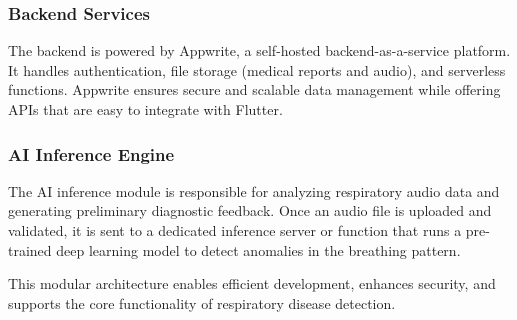 \subsubsection*{Backend Services}

The backend is powered by Appwrite, a self-hosted backend-as-a-service platform. It handles authentication, file storage (medical reports and audio), and serverless functions. Appwrite ensures secure and scalable data management while offering APIs that are easy to integrate with Flutter.

\subsubsection*{AI Inference Engine}

The AI inference module is responsible for analyzing respiratory audio data and generating preliminary diagnostic feedback. Once an audio file is uploaded and validated, it is sent to a dedicated inference server or function that runs a pre-trained deep learning model to detect anomalies in the breathing pattern.

\vspace{1em}

This modular architecture enables efficient development, enhances security, and supports the core functionality of respiratory disease detection.
